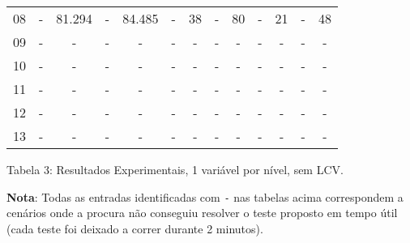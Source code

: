\documentclass[12pt,a4paper]{article}
\begin{document}
\begin{adjustbox}{width={\textwidth}, totalheight={\textheight}, keepaspectratio}
\begin{tabular}{l cccc cccc cccc}
            08    & -                                          & 81.294                          & -                                  & 84.485     & -   & 38   & -     & 80         & -   & 21   & -     & 48         \\
            09    & -                                          & -                               & -                                  & -          & -   & -    & -     & -          & -   & -    & -     & -          \\
            10    & -                                          & -                               & -                                  & -          & -   & -    & -     & -          & -   & -    & -     & -          \\
            11    & -                                          & -                               & -                                  & -          & -   & -    & -     & -          & -   & -    & -     & -          \\
            12    & -                                          & -                               & -                                  & -          & -   & -    & -     & -          & -   & -    & -     & -          \\
            13    & -                                          & -                               & -                                  & -          & -   & -    & -     & -          & -   & -    & -     & -          \\
            \bottomrule
      \end{tabular}
\end{adjustbox}

\vspace*{0.5cm}

\begin{center}
      Tabela 3: Resultados Experimentais, 1 variável por nível, sem LCV.
\end{center}

\vspace*{1cm}

\textbf{Nota}: Todas as entradas identificadas com \texttt{-} nas tabelas acima correspondem a
cenários onde a procura não conseguiu resolver o teste proposto em tempo útil (cada
teste foi deixado a correr durante 2 minutos).
\end{document}
